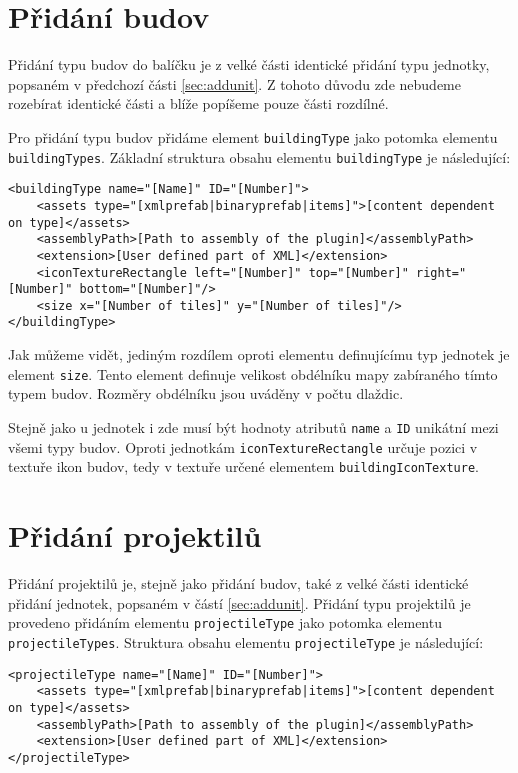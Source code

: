 \section{Přidání budov}
Přidání typu budov do balíčku je z velké části identické přidání typu jednotky, popsaném v předchozí části \ref{sec:addunit}. Z tohoto důvodu zde nebudeme rozebírat identické části a blíže popíšeme pouze části rozdílné.

Pro přidání typu budov přidáme element \texttt{buildingType} jako potomka elementu \texttt{buildingTypes}. Základní struktura obsahu elementu \texttt{buildingType} je následující:
\begin{lstlisting}
<buildingType name="[Name]" ID="[Number]">
	<assets type="[xmlprefab|binaryprefab|items]">[content dependent on type]</assets>
	<assemblyPath>[Path to assembly of the plugin]</assemblyPath>
	<extension>[User defined part of XML]</extension>
	<iconTextureRectangle left="[Number]" top="[Number]" right="[Number]" bottom="[Number]"/>
	<size x="[Number of tiles]" y="[Number of tiles]"/>
</buildingType>
\end{lstlisting}

Jak můžeme vidět, jediným rozdílem oproti elementu definujícímu typ jednotek je element \texttt{size}. Tento element definuje velikost obdélníku mapy zabíraného tímto typem budov. Rozměry obdélníku jsou uváděny v počtu dlaždic.

Stejně jako u jednotek i zde musí být hodnoty atributů \texttt{name} a \texttt{ID} unikátní mezi všemi typy budov. Oproti jednotkám \texttt{iconTextureRectangle} určuje pozici v textuře ikon budov, tedy v textuře určené elementem \texttt{buildingIconTexture}.


\section{Přidání projektilů}
Přidání projektilů je, stejně jako přidání budov, také z velké části identické přidání jednotek, popsaném v částí \ref{sec:addunit}. Přidání typu projektilů je provedeno přidáním elementu \texttt{projectileType} jako potomka elementu \texttt{projectileTypes}. Struktura obsahu elementu \texttt{projectileType} je následující:

\begin{lstlisting}
<projectileType name="[Name]" ID="[Number]">
	<assets type="[xmlprefab|binaryprefab|items]">[content dependent on type]</assets>
	<assemblyPath>[Path to assembly of the plugin]</assemblyPath>
	<extension>[User defined part of XML]</extension>
</projectileType>
\end{lstlisting}

